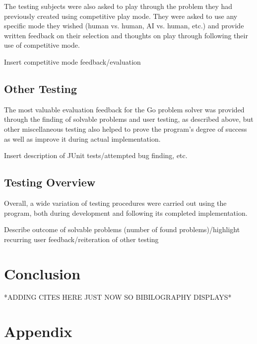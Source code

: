 \documentclass{l3proj}
\begin{document}
The testing subjects were also asked to play through the problem they had previously created using competitive play mode. They were asked to use any specific mode they wished (human vs. human, AI vs. human, etc.) and provide written feedback on their selection and thoughts on play through following their use of competitive mode.

Insert competitive mode feedback/evaluation

\section{Other Testing}

The most valuable evaluation feedback for the Go problem solver was provided through the finding of solvable problems and user testing, as described above, but other miscellaneous testing also helped to prove the program's degree of success as well as improve it during actual implementation.

Insert description of JUnit tests/attempted bug finding, etc.

\section{Testing Overview}

Overall, a wide variation of testing procedures were carried out using the program, both during development and following its completed implementation.

Describe outcome of solvable problems (number of found problems)/highlight recurring user feedback/reiteration of other testing

\chapter{Conclusion}
\label{conclusion}

*ADDING CITES HERE JUST NOW SO BIBILOGRAPHY DISPLAYS*
\cite{2DAPI,Swing,Graphics,BeginnerGo,GoProbs,AI,MCG}




\chapter{Appendix}
\label{appendix}


\end{document}

